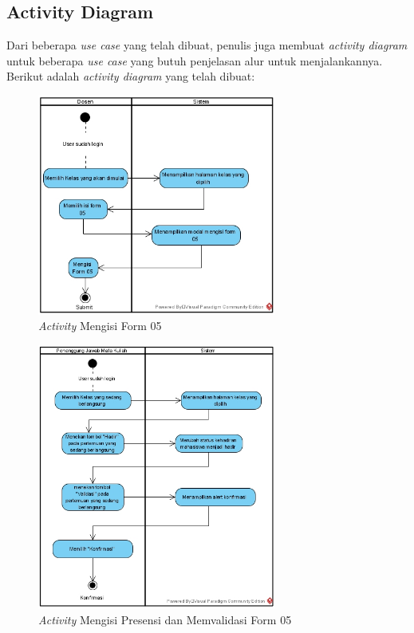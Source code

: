 \subsection{Activity Diagram}

Dari beberapa \textit{use case} yang telah dibuat, penulis juga membuat \textit{activity diagram} untuk beberapa \textit{use case} yang butuh penjelasan alur untuk menjalankannya. Berikut adalah \textit{activity diagram} yang telah dibuat:

\begin{figure}[h!]
	\centering
	\includegraphics[width=0.7\textwidth]{gambar/diagram/Mengisi Form 05}
	\caption{\textit{Activity} Mengisi Form 05}
	\label{fig:activity2}
\end{figure}

\begin{figure}[h!]
	\centering
	\includegraphics[width=0.7\textwidth]{gambar/diagram/Mengisi Presensi dan Memvalidasi Form 05}
	\caption{\textit{Activity} Mengisi Presensi dan Memvalidasi Form 05}
	\label{fig:activity1}
\end{figure}

